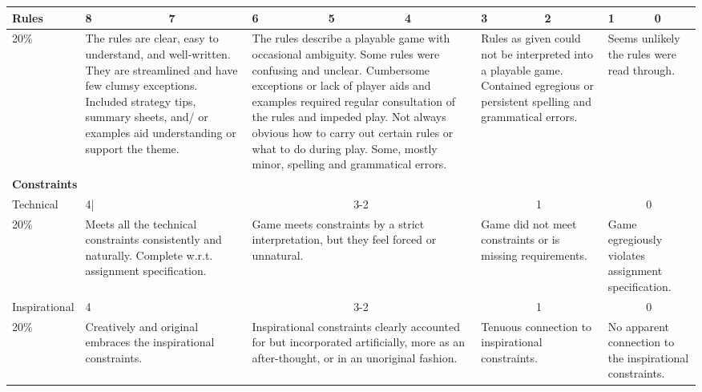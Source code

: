 \documentclass{article}
\begin{document}
\begin{table}[t]
\begin{center}
\begin{tabular}{ l | *{9}{p{.1\linewidth}|}}
Rules & 8 & 7 & 6 & 5 & 4 & 3 & 2 & 1 & 0\\\hline
20\% 
	& \multicolumn{2}{p{.1\linewidth}|}{The rules are clear, easy to understand, and well-written. They are streamlined and have few clumsy exceptions. Included strategy tips, summary sheets, and/ or examples aid understanding or support the theme.}
	& \multicolumn{3}{p{.1\linewidth}|}{The rules describe a playable game with occasional ambiguity. Some rules were confusing and unclear. Cumbersome exceptions or lack of player aids and examples required regular consultation of the rules and impeded play. Not always obvious how to carry out certain rules or what to do during play. Some, mostly minor, spelling and grammatical errors.}
	& \multicolumn{2}{p{.1\linewidth}|}{Rules as given could not be interpreted into a playable game. Contained egregious or persistent spelling and grammatical errors.}
	& \multicolumn{2}{p{.1\linewidth}}{Seems unlikely the rules were read through.}\\\hline

\multicolumn{10}{l}{{\bf Constraints}}\\\hline

Technical & \multicolumn{2}{p{.1\linewidth}}{4|} & \multicolumn{3}{c|}{3-2} & \multicolumn{2}{c}{1} & \multicolumn{2}{c}{0} \\\hline
20\% 
	& \multicolumn{2}{p{.1\linewidth}|}{Meets all the technical constraints consistently and naturally. Complete w.r.t. assignment specification.}
	& \multicolumn{3}{p{.1\linewidth}|}{Game meets constraints by a strict interpretation, but they feel forced or unnatural.}
	& \multicolumn{2}{p{.1\linewidth}|}{Game did not meet constraints or is missing requirements.}
	& \multicolumn{2}{p{.1\linewidth}}{Game egregiously violates assignment specification.}\\\hline
Inspirational & \multicolumn{2}{p{.1\linewidth}|}{4} & \multicolumn{3}{c|}{3-2} & \multicolumn{2}{c|}{1} & \multicolumn{2}{c}{0} \\\hline
20\% 
	& \multicolumn{2}{p{.1\linewidth}|}{Creatively and original embraces the inspirational constraints.}
	& \multicolumn{3}{p{.1\linewidth}|}{Inspirational constraints clearly accounted for but incorporated artificially, more as an after-thought, or in an unoriginal fashion.}
	& \multicolumn{2}{p{.1\linewidth}|}{Tenuous connection to inspirational constraints.}
	& \multicolumn{2}{p{.1\linewidth}}{No apparent connection to the inspirational constraints.}\\\hline
\end{tabular}
\end{center}
\end{table}
\end{document}
